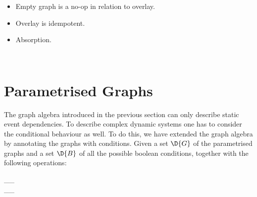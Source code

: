 \begin{itemize}
\item{Empty graph is a no-op in relation to overlay.
\begin{hscode}\SaveRestoreHook
{}%
%
%
\>[3]{}\;\mathbin{:}\;\;\;\;\;\D{+}\;\D{\varepsilon}\;\;\<[E]%
\ColumnHook
\end{hscode}\resethooks
}
\item{Overlay is idempotent.
\begin{hscode}\SaveRestoreHook
{}%
%
%
\>[3]{}\;\mathbin{:}\;\;\;\;\;\D{+}\;\;\;\<[E]%
\ColumnHook
\end{hscode}\resethooks
}
\item{Absorption.
\begin{hscode}\SaveRestoreHook
{}%
%
%
\>[3]{}\;\mathbin{:}\;\;\;\;\;\;\D{\seq}\;\;\D{+}\;\;\;\;\D{\seq}\;\<[E]%
\\
\>[3]{}\;\mathbin{:}\;\;\;\;\;\;\D{\seq}\;\;\D{+}\;\;\;\;\D{\seq}\;\<[E]%
\ColumnHook
\end{hscode}\resethooks
}
\end{itemize}

\section{Parametrised Graphs}


The graph algebra introduced in the previous section can only describe static event dependencies.
To describe complex dynamic systems one has to consider the conditional behaviour as well.
To do this, we have extended the graph algebra by annotating the graphs with conditions.
Given a set \ensuremath{\D{G}} of the parametrised graphs and a set \ensuremath{\D{B}} of all the possible boolean conditions, together with the following operations:

\begin{hscode}\SaveRestoreHook
{}%
%
%
\>[3]{}\_\_\;\mathbin{:}\;\;\;\;\;\<[E]%
\\
\>[3]{}\_\_\;\mathbin{:}\;\;\;\;\;\<[E]%
\\
\>[3]{}\;\mathbin{:}\;\;\;\<[E]%
\\
\>[3]{}\;\mathbin{:}\;\<[E]%
\\
\>[3]{}\;\mathbin{:}\;\<[E]%
\ColumnHook
\end{hscode}\resethooks

